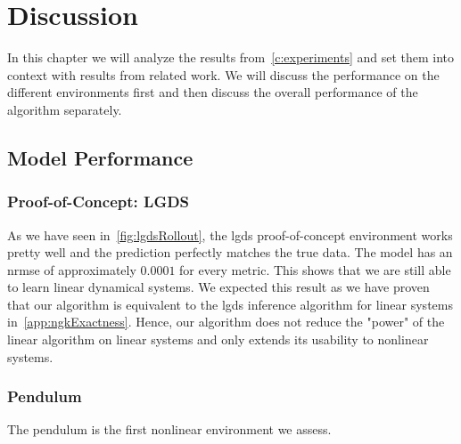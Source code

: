 \chapter{Discussion}
\label{c:discussion}



In this chapter we will analyze the results from~\autoref{c:experiments} and set them into context with results from related work. We will discuss the performance on the different environments first and then discuss the overall performance of the \algname algorithm separately.

\section{Model Performance}
	\subsection{Proof-of-Concept: LGDS}
		As we have seen in~\autoref{fig:lgdsRollout}, the \ac{lgds} proof-of-concept environment works pretty well and the prediction perfectly matches the true data. The model has an \ac{nrmse} of approximately \( 0.0001 \) for every metric. This shows that we are still able to learn linear dynamical systems. We expected this result as we have proven that our algorithm is equivalent to the \ac{lgds} inference algorithm for linear systems in~\autoref{app:ngkExactness}. Hence, our algorithm does not reduce the "power" of the linear algorithm on linear systems and only extends its usability to nonlinear systems.

	\subsection{Pendulum}
		\label{subsec:discussPendulum}

		The pendulum is the first nonlinear environment we assess.

